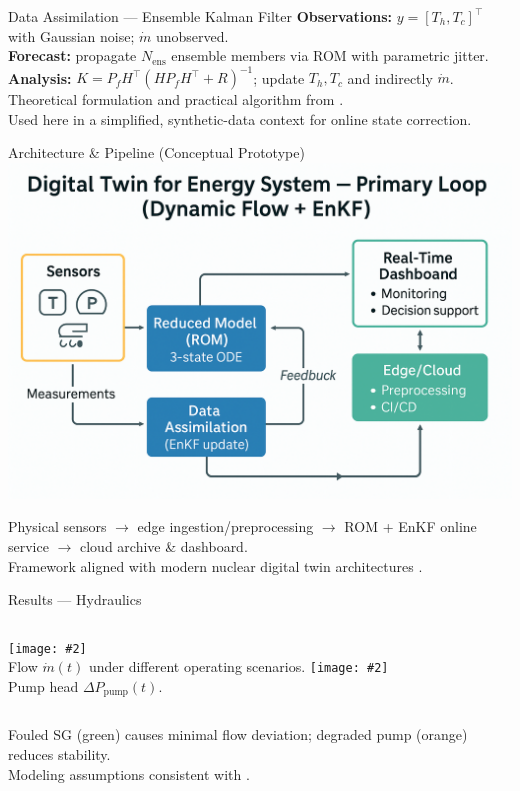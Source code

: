 \documentclass[aspectratio=169]{beamer}
\newcommand{\img}[2][]{\texttt{[image: \#2]}}
\begin{document}
\begin{frame}{Data Assimilation — Ensemble Kalman Filter}
\small
\textbf{Observations:} $y=[T_h,T_c]^\top$ with Gaussian noise; $\dot m$ unobserved.\\
\textbf{Forecast:} propagate $N_{\text{ens}}$ ensemble members via ROM with parametric jitter.\\
\textbf{Analysis:} $K=P_fH^\top(HP_fH^\top+R)^{-1}$; update $T_h,T_c$ and indirectly $\dot m$.\\

\medskip
\footnotesize
Theoretical formulation and practical algorithm from \cite{evensen_ensemble_2003}.\\
Used here in a simplified, synthetic-data context for online state correction.
\end{frame}

\begin{frame}{Architecture \& Pipeline (Conceptual Prototype)}
\centering
\includegraphics[width=0.8\linewidth]{assets/arch_twin_energy.png}

\vspace{0.6em}
\footnotesize
Physical sensors $\rightarrow$ edge ingestion/preprocessing $\rightarrow$ ROM + EnKF online service $\rightarrow$ cloud archive \& dashboard.\\
Framework aligned with modern nuclear digital twin architectures \cite{mengyan_current_2024, kochunas_digital_2021}.
\end{frame}

\begin{frame}{Results — Hydraulics}
\begin{columns}[T,onlytextwidth]
\img[0.98]{assets/fig_flow_cases_dynamic.png}\\[-0.2em]
\footnotesize Flow $\dot m(t)$ under different operating scenarios.
\img[0.98]{assets/fig_dpump_cases_dynamic.png}\\[-0.2em]
\footnotesize Pump head $\Delta P_{\text{pump}}(t)$.
\end{columns}
\medskip
\footnotesize
Fouled SG (green) causes minimal flow deviation; degraded pump (orange) reduces stability.\\
Modeling assumptions consistent with \cite{dong_lumped-parameter_2018}.
\end{frame}
\end{document}
